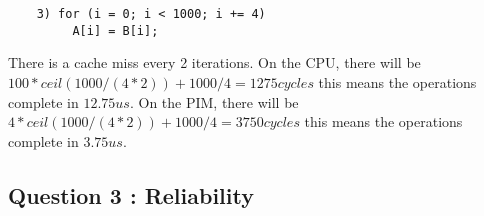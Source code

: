 \begin{verbatim}
    3) for (i = 0; i < 1000; i += 4) 
         A[i] = B[i]; 
\end{verbatim}

There is a cache miss every 2 iterations. On the CPU, there will be
$100*ceil(1000/(4*2)) + 1000/4 = 1275cycles$ this means the operations
complete in $12.75us$. On the PIM, there will be
$4*ceil(1000/(4*2)) + 1000/4 = 3750cycles$ this means the operations
complete in $3.75us$.

\subsection{Question 3 : Reliability}
